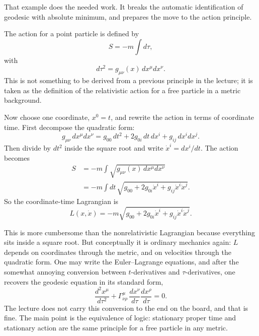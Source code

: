 That example does the needed work. It breaks the automatic identification of geodesic with absolute minimum, and prepares the move to the action principle.

The action for a point particle is defined by
\begin{equation}
S = -m \int d\tau,
\end{equation}
with
\begin{equation}
d\tau^2 = g_{\mu\nu}(x)\,dx^\mu dx^\nu.
\end{equation}
This is not something to be derived from a previous principle in the lecture; it is taken as the definition of the relativistic action for a free particle in a metric background.

Now choose one coordinate, \(x^0=t\), and rewrite the action in terms of coordinate time. First decompose the quadratic form:
\begin{equation}
g_{\mu\nu}\,dx^\mu dx^\nu
=
g_{00}\,dt^2 + 2g_{0i}\,dt\,dx^i + g_{ij}\,dx^i dx^j.
\end{equation}
Then divide by \(dt^2\) inside the square root and write \(\dot x^i = dx^i/dt\). The action becomes
\begin{align}
S
&=
-m\int \sqrt{g_{\mu\nu}(x)\,dx^\mu dx^\nu}
\\
&=
-m\int dt\,
\sqrt{g_{00}+2g_{0i}\dot x^i+g_{ij}\dot x^i\dot x^j}.
\end{align}
So the coordinate-time Lagrangian is
\begin{equation}
L(x,\dot x)
=
-m\sqrt{g_{00}+2g_{0i}\dot x^i+g_{ij}\dot x^i\dot x^j}.
\end{equation}

This is more cumbersome than the nonrelativistic Lagrangian because everything sits inside a square root. But conceptually it is ordinary mechanics again: \(L\) depends on coordinates through the metric, and on velocities through the quadratic form. One may write the Euler--Lagrange equations, and after the somewhat annoying conversion between \(t\)-derivatives and \(\tau\)-derivatives, one recovers the geodesic equation in its standard form,
\begin{equation}
\frac{d^2x^\mu}{d\tau^2}
+
\Gamma^\mu_{\nu\rho}\,
\frac{dx^\nu}{d\tau}
\frac{dx^\rho}{d\tau}
=0.
\end{equation}
The lecture does not carry this conversion to the end on the board, and that is fine. The main point is the equivalence of logic: stationary proper time and stationary action are the same principle for a free particle in any metric.

